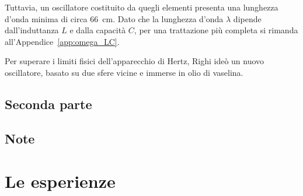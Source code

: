 Tuttavia, un oscillatore costituito da quegli elementi presenta una lunghezza d'onda minima di circa 66~cm.
Dato che la lunghezza d'onda $\lambda$ dipende dall'induttanza $L$ e dalla capacità $C$, per una trattazione più completa si
rimanda all'Appendice~\ref{app:omega_LC}.

Per superare i limiti fisici dell'apparecchio di Hertz, Righi ideò un nuovo oscillatore, basato su due sfere
vicine e immerse in olio di vaselina.

\subsection{Seconda parte}

\subsection{Note}

\section{Le esperienze}